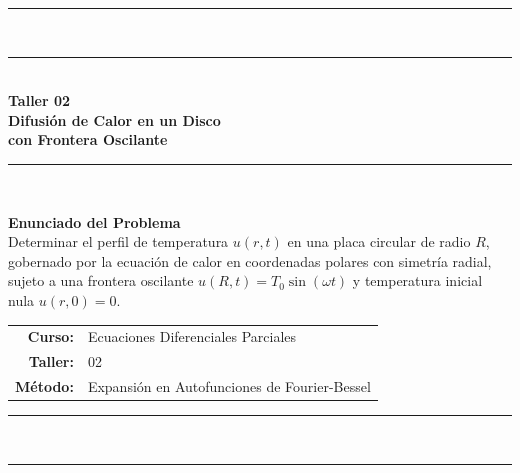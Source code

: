 \documentclass[12pt, a4paper]{article}
\begin{document}
\begin{titlepage}
  \centering
  \vspace*{1cm}

  {\color{azulprimario}\rule{\linewidth}{1.5pt}}\\[0.4cm]
  {\color{azulprimario}\rule{\linewidth}{0.4pt}}\\[1.5cm]

  {\huge\bfseries\color{azulprimario}
    Taller 02\\[0.4cm]
    \large Difusión de Calor en un Disco\\
    con Frontera Oscilante
  }\\[1.5cm]

  {\color{azulprimario}\rule{0.6\linewidth}{0.4pt}}\\[1cm]

  \begin{tcolorbox}[
    enhanced,
    colback=azulclaro,
    colframe=azulprimario,
    arc=4mm,
    boxrule=1pt,
    width=0.85\textwidth
  ]
  \centering
  {\large\bfseries Enunciado del Problema}\\[0.5em]
  {\normalsize
  Determinar el perfil de temperatura $u(r,t)$ en una placa circular de radio $R$,
  gobernado por la ecuación de calor en coordenadas polares con simetría radial,
  sujeto a una frontera oscilante $u(R,t) = T_0\sin(\omega t)$
  y temperatura inicial nula $u(r,0) = 0$.
  }
  \end{tcolorbox}

  \vspace{1.5cm}

  \begin{tabular}{rl}
    \textbf{\color{azulprimario}Curso:}    & Ecuaciones Diferenciales Parciales \\[0.3em]
    \textbf{\color{azulprimario}Taller:}   & 02 \\[0.3em]
    \textbf{\color{azulprimario}Método:}   & Expansión en Autofunciones de Fourier-Bessel \\[0.3em]
  \end{tabular}

  \vfill

  {\color{azulprimario}\rule{\linewidth}{0.4pt}}\\[0.4cm]
  {\color{azulprimario}\rule{\linewidth}{1.5pt}}
\end{titlepage}

\tableofcontents
\newpage
\end{document}
